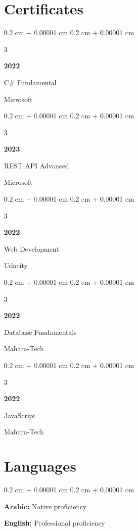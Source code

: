 \documentclass[10pt, letterpaper]{article}
\newenvironment{highlights}{
    \begin{itemize}[
        topsep=0.10 cm,
        parsep=0.10 cm,
        partopsep=0pt,
        itemsep=0pt,
        leftmargin=0.4 cm + 10pt
    ]
}{
    \end{itemize}
} %
\newenvironment{onecolentry}{
    \begin{adjustwidth}{
        0.2 cm + 0.00001 cm
    }{
        0.2 cm + 0.00001 cm
    }
}{
    \end{adjustwidth}
} %
\newenvironment{threecolentry}[3][]{
    \onecolentry
    \def\thirdColumn{#3}
    \setcolumnwidth{1 cm, \fill, 4.5 cm}
    \begin{paracol}{3}
    {\raggedright #2} \switchcolumn
}{
    \switchcolumn \raggedleft \thirdColumn
    \end{paracol}
    \endonecolentry
} %
\begin{document}
        \vspace{0.2 cm}



    \section{Certificates}
    
        \begin{threecolentry}{\textbf{2022}}{
            Microsoft
        }
            C\# Fundamental
        \end{threecolentry}


        \begin{threecolentry}{\textbf{2023}}{
            Microsoft
        }
            REST API Advanced
        \end{threecolentry}
        
        \begin{threecolentry}{\textbf{2022}}{
            Udacity
        }
            Web Development
        \end{threecolentry}


        \begin{threecolentry}{\textbf{2022}}{
            Mahara-Tech
        }
            Database Fundamentals
        \end{threecolentry}


        \begin{threecolentry}{\textbf{2022}}{
            Mahara-Tech
        }
            JavaScript
        \end{threecolentry}



         \vspace{0.2 cm}


    \section{Languages}
    
        \begin{onecolentry}
            \item \textbf{Arabic:} Native proficiency
            \item \textbf{English:} Professional proficiency
        \end{onecolentry}

    
\end{document}
